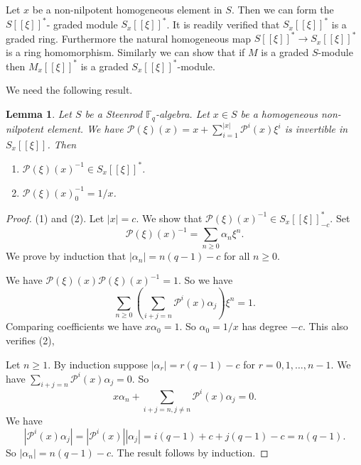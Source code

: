 \documentclass{amsart}
\newcommand{\F}{\mathbb{F} }
\newcommand{\Pc}{\mathcal{P} }
\newcommand{\rt}{\rightarrow}
\theoremstyle{plain}
\newtheorem{lemma}[theorem]{Lemma}
\theoremstyle{definition}
\theoremstyle{remark}
\begin{document}
\s\label{loc-ring-m} Let $x$ be a non-nilpotent homogeneous element in $S$. Then we can form the $S[[\xi]]^* $- graded module $S_x[[\xi]]^*$. It is readily verified that $S_x[[\xi]]^*$ is a graded ring. Furthermore  the natural
homogeneous map $S[[\xi]]^* \rt S_x[[\xi]]^* $ is a ring homomorphism.
Similarly we can show that if $M$ is a graded $S$-module then  $M_x[[\xi]]^*$ is a graded $S_x[[\xi]]^* $-module.

We need the following result.
\begin{lemma}
\label{inv}Let $S$ be a Steenrod $\F_q$-algebra. Let $x \in S$ be a homogeneous non-nilpotent element. We have $\Pc(\xi)(x) = x + \sum_{i = 1}^{|x|}\Pc^i(x)\xi^i$ is invertible in $S_x[[\xi]]$.
Then \begin{enumerate}[\rm (1)]
       \item $\Pc(\xi)(x)^{-1} \in S_x[[\xi]]^*$.
       \item $\Pc(\xi)(x)^{-1}_0 = 1/x$.
     \end{enumerate}

\end{lemma}
\begin{proof}
(1) and (2).  Let $|x| = c$. We show that $\Pc(\xi)(x)^{-1} \in S_x[[\xi]]^*_{-c}$.
  Set
  $$ \Pc(\xi)(x)^{-1} = \sum_{n \geq 0}\alpha_n\xi^n. $$
  We prove by induction that  $|\alpha_n| = n(q-1) -c$ for all $n \geq 0$.

  We have $ \Pc(\xi)(x)  \Pc(\xi)(x)^{-1}  = 1$. So we have
 $$ \sum_{n \geq 0}\left(\sum_{i+j = n}\Pc^i(x)\alpha_j\right)\xi^n   = 1.$$
 Comparing coefficients we have $x\alpha_0 = 1$. So $\alpha_0 = 1/x$ has degree $-c$. This also verifies (2),

 Let $n \geq 1$. By induction suppose  $|\alpha_r| = r(q-1) -c$ for $r = 0, 1, \ldots, n-1$.
 We have $\sum_{i+j = n}\Pc^i(x)\alpha_j = 0$.
 So
 \[
 x\alpha_n +  \sum_{i+j = n, j\neq n}\Pc^i(x)\alpha_j = 0.
 \]
 We have $$|\Pc^i(x)\alpha_j|  = |\Pc^i(x)||\alpha_j| = i(q-1) + c + j(q-1)-c = n(q-1). $$
 So $|\alpha_n| = n(q-1) -c$. The result follows by induction.
\end{proof}
\end{document}
